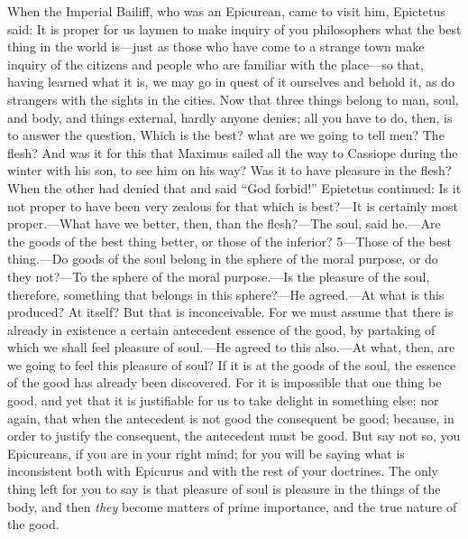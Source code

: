When the Imperial Bailiff, who was an Epicurean, came to visit him, Epictetus said: It is proper for us laymen to make inquiry of you philosophers what the best thing in the world is—just as those who have come to a strange town make inquiry of the citizens and people who are familiar with the place—so that, having learned what it is, we may go in quest of it ourselves and behold it, as do strangers with the sights in the cities. Now that three things belong to man, soul, and body, and things external, hardly anyone denies; all you have to do, then, is to answer the question, Which is the best? what are we going to tell men? The flesh? And was it for this that Maximus sailed all the way to Cassiope during the winter with his son, to see him on his way? Was it to have pleasure in the flesh? When the other had denied that and said ``God forbid!'' Epietetus continued: Is it not proper to have been very zealous for that which is best?—It is certainly most proper.—What have we better, then, than the flesh?—The soul, said he.—Are the goods of the best thing better, or those of the inferior? 5—Those of the best thing.—Do goods of the soul belong in the sphere of the moral purpose, or do they not?—To the sphere of the moral purpose.—Is the pleasure of the soul, therefore, something that belongs in this sphere?—He agreed.—At what is this produced? At itself? But that is inconceivable. For we must assume that there is already in existence a certain antecedent essence of the good, by partaking of which we shall feel pleasure of soul.—He agreed to this also.—At what, then, are we going to feel this pleasure of soul? If it is at the goods of the soul, the essence of the good has already been discovered. For it is impossible that one thing be good, and yet that it is justifiable for us to take delight in something else; nor again, that when the antecedent is not good the consequent be good; because, in order to justify the consequent, the antecedent must be good. But say not so, you Epicureans, if you are in your right mind; for you will be saying what is inconsistent both with Epicurus and with the rest of your doctrines. The only thing left for you to say is that pleasure of soul is pleasure in the things of the body, and then \emph{they} become matters of prime importance, and the true nature of the good.

